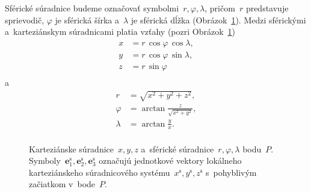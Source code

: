 \documentclass[a4paper, 12pt]{book}
\let\vec\mathbf
\begin{document}
Sférické súradnice budeme označovať symbolmi~$r, \varphi, \lambda$, pričom~$r$ 
predstavuje sprievodič, $\varphi$ je sférická šírka a~$\lambda$ je sférická 
dĺžka (Obrázok~\ref{fig:cart_sph}).  Medzi sférickými a~karteziánskym 
súradnicami platia vzťahy (pozri Obrázok~\ref{fig:cart_sph})
%
\begin{equation}
\label{eq:sph2cart}
\begin{split}
x &= r \, \cos\varphi \, \cos\lambda{,}\\
y &= r \, \cos\varphi \, \sin\lambda{,}\\
z &= r \, \sin\varphi\\
\end{split}
\end{equation}
%
a
%
\begin{equation}
\label{eq:cart2sph}
\begin{split}
r &= \sqrt{x^2 + y^2 + z^2}{,}\\
\varphi &= \arctan \frac{z}{\sqrt{x^2 + y^2}}{,}\\
\lambda &= \arctan \frac{y}{x}{.}\\
\end{split}
\end{equation}

\begin{figure}
\centering

\caption{Karteziánske súradnice~$x, y, z$ a~sférické súradnice~$r, \varphi, 
\lambda$ bodu~$P$.  Symboly~$\vec{e}_1^\mathrm{s}, \vec{e}_2^\mathrm{s}, 
\vec{e}_3^\mathrm{s}$ označujú jednotkové vektory lokálneho karteziánskeho 
súradnicového systému~$x^\mathrm{s}, y^\mathrm{s}, z^\mathrm{s}$ s~pohyblivým 
začiatkom v~bode~$P$.}
\label{fig:cart_sph}
\end{figure}
\end{document}
